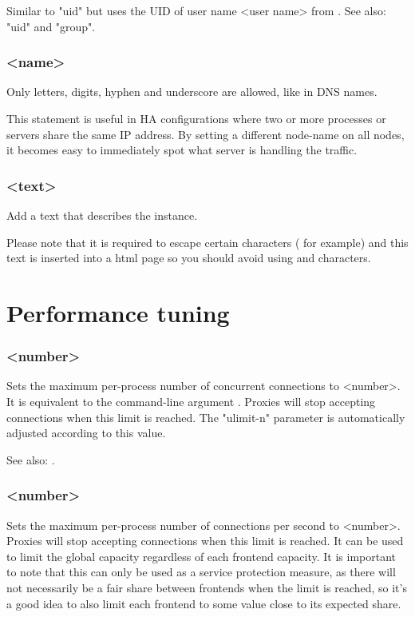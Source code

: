 Similar to "uid" but uses the UID of user name <user name> from .
See also: "uid" and "group".

\subsubsection[node]{ <name>}

Only letters, digits, hyphen and underscore are allowed, like in DNS names.

This statement is useful in HA configurations where two or more processes or
servers share the same IP address. By setting a different node-name on all
nodes, it becomes easy to immediately spot what server is handling the
traffic.

\subsubsection[description]{ <text>}

Add a text that describes the instance.

Please note that it is required to escape certain characters (\chr{\#} for example)
and this text is inserted into a html page so you should avoid using
\chr{<} and \chr{>} characters.

\section{Performance tuning}
\label{sec:performance}

\subsubsection[maxconn]{ <number>}

Sets the maximum per-process number of concurrent connections to <number>. It
is equivalent to the command-line argument . Proxies will stop accepting
connections when this limit is reached. The "ulimit-n" parameter is
automatically adjusted according to this value.

See also: .

\subsubsection[maxconnrate]{ <number>}

Sets the maximum per-process number of connections per second to <number>.
Proxies will stop accepting connections when this limit is reached. It can be
used to limit the global capacity regardless of each frontend capacity. It is
important to note that this can only be used as a service protection measure,
as there will not necessarily be a fair share between frontends when the
limit is reached, so it's a good idea to also limit each frontend to some
value close to its expected share.


